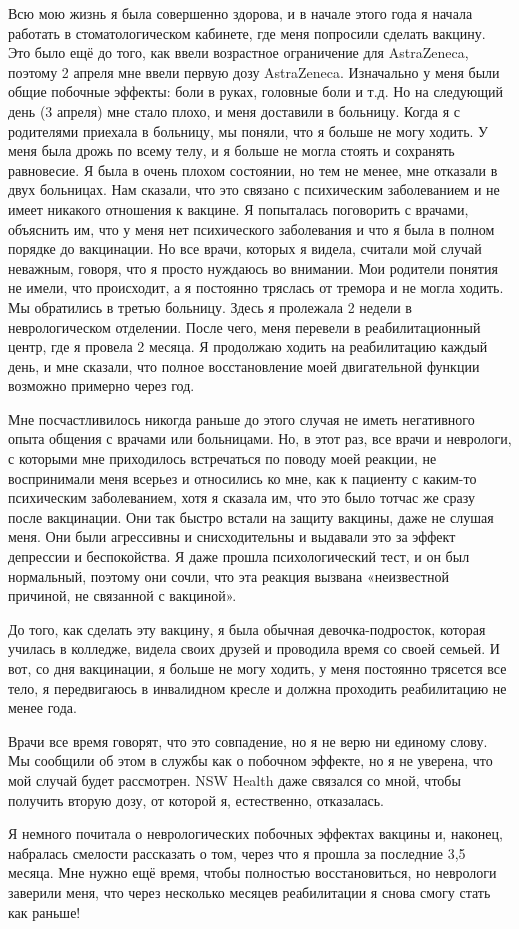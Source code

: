 Всю мою жизнь я была совершенно здорова, и в начале этого года я начала работать
в стоматологическом кабинете, где меня попросили сделать вакцину. Это было ещё
до того, как ввели возрастное ограничение для AstraZeneca, поэтому 2 апреля мне
ввели первую дозу AstraZeneca. Изначально у меня были общие побочные эффекты:
боли в руках, головные боли и т.д. Но на следующий день (3 апреля) мне стало
плохо, и меня доставили в больницу. Когда я с родителями приехала в больницу, мы
поняли, что я больше не могу ходить. У меня была дрожь по всему телу, и я больше
не могла стоять и сохранять равновесие. Я была в очень плохом состоянии, но тем
не менее, мне отказали в двух больницах. Нам сказали, что это связано с
психическим заболеванием и не имеет никакого отношения к вакцине. Я попыталась
поговорить с врачами, объяснить им, что у меня нет психического заболевания и
что я была в полном порядке до вакцинации. Но все врачи, которых я видела,
считали мой случай неважным, говоря, что я просто нуждаюсь во внимании. Мои
родители понятия не имели, что происходит, а я постоянно тряслась от тремора и
не могла ходить. Мы обратились в третью больницу. Здесь я пролежала 2 недели в
неврологическом отделении. После чего, меня перевели в реабилитационный центр,
где я провела 2 месяца. Я продолжаю ходить на реабилитацию каждый день, и мне
сказали, что полное восстановление моей двигательной функции возможно примерно
через год.

Мне посчастливилось никогда раньше до этого случая не иметь негативного опыта
общения с врачами или больницами. Но, в этот раз, все врачи и неврологи, с
которыми мне приходилось встречаться по поводу моей реакции, не воспринимали
меня всерьез и относились ко мне, как к пациенту с каким-то психическим
заболеванием, хотя я сказала им, что это было тотчас же сразу после
вакцинации. Они так быстро встали на защиту вакцины, даже не слушая меня. Они
были агрессивны и снисходительны и выдавали это за эффект депрессии и
беспокойства. Я даже прошла психологический тест, и он был нормальный, поэтому
они сочли, что эта реакция вызвана «неизвестной причиной, не связанной с
вакциной».

До того, как сделать эту вакцину, я была обычная девочка-подросток, которая
училась в колледже, видела своих друзей и проводила время со своей семьей. И
вот, со дня вакцинации, я больше не могу ходить, у меня постоянно трясется все
тело, я передвигаюсь в инвалидном кресле и должна проходить реабилитацию не
менее года.

Врачи все время говорят, что это совпадение, но я не верю ни единому слову. Мы
сообщили об этом в службы как о побочном эффекте, но я не уверена, что мой
случай будет рассмотрен. NSW Health даже связался со мной, чтобы получить вторую
дозу, от которой я, естественно, отказалась.

Я немного почитала о неврологических побочных эффектах вакцины и, наконец,
набралась смелости рассказать о том, через что я прошла за последние 3,5
месяца. Мне нужно ещё время, чтобы полностью восстановиться, но неврологи
заверили меня, что через несколько месяцев реабилитации я снова смогу стать как
раньше!

